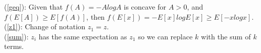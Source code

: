 \documentclass{article} %
\begin{document}
(\ref{geq}): Given that $f(A)=-AlogA$ is concave for $A>0$, and $f(E[A])\geq E[f(A)]$, then $f(E[x])=-E[x]logE[x]\geq E[-xlogx]$.\\ 
(\ref{z1}): Change of notation $z_1 = z$.\\
(\ref{sum}): $z_i$ has the same expectation as $z_1$ so we can replace $k$ with the sum of $k$ terms.





\end{document}
